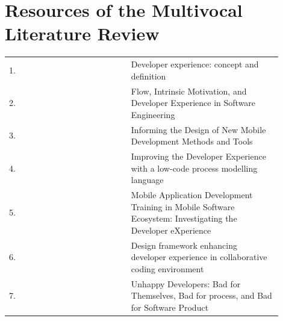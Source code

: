 \documentclass[english, 12pt, a4paper, sci, utf8, a-1b, online]{aaltothesis}
\begin{document}
\clearpage
\thesisbibliography
\printbibliography

\clearpage
\thesisappendix

\section{Resources of the Multivocal Literature Review}

\renewcommand{\arraystretch}{1.5}

\begin{center}
  \begin{longtable}{p{0.05\linewidth}p{0.35\linewidth}p{0.5\linewidth}}
    \label{table:scientific-articles}                                                                                                                                                                         \\
    1.  & \textcite{fagerholm-dx-concept-and-definition}        & Developer experience: concept and definition                                                                                                \\
    2.  & \textcite{flow-intrinsic-dx}                          & Flow, Intrinsic Motivation, and Developer Experience in Software Engineering                                                                \\
    3.  & \textcite{nebeling2013informing}                      & Informing the Design of New Mobile Development Methods and Tools                                                                            \\
    4.  & \textcite{henriques2018improving}                     & Improving the Developer Experience with a low-code process modelling language                                                               \\
    5.  & \textcite{fontao2018mobile}                           & Mobile Application Development Training in Mobile Software Ecosystem: Investigating the Developer eXperience                                \\
    6.  & \textcite{design-framework-enhancing}                 & Design framework enhancing developer experience in collaborative coding environment                                                         \\
    7.  & \textcite{unhappy-developers}                         & Unhappy Developers: Bad for Themselves, Bad for process, and Bad for Software Product                                                       \\

\end{longtable}
\end{center}
\end{document}
